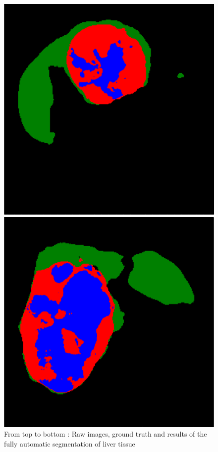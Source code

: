\begin{figure}[!ht]
\begin{minipage}{4cm}
\end{minipage} \hspace{-0.3cm}
\begin{minipage}{4cm}
\includegraphics[width=\linewidth]{../SemanticSeg/images/2_3_FullAuto_resized}
\end{minipage} \hspace{-0.3cm}
\begin{minipage}{4cm}
\includegraphics[width=\linewidth]{../SemanticSeg/images/5_4_FullAuto_resized}
\end{minipage} 
\caption{From top to bottom : Raw images, ground truth and results of the fully automatic segmentation of liver tissue}
\label{FullAutoSeg}
\end{figure}
\renewcommand{\baselinestretch}{1.75}
\renewcommand{\arraystretch}{5}


